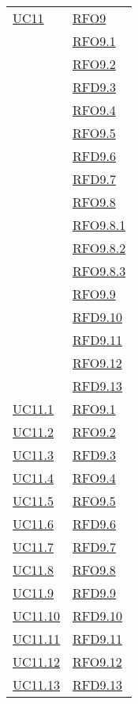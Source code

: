 \begin{longtable}{|>{\centering}m{5cm}|m{5cm}<{\centering}|}
\hyperlink{UC11}{UC11} 
& \hyperlink{RFO9}{RFO9}\\
& \hyperlink{RFO9.1}{RFO9.1}\\
& \hyperlink{RFO9.2}{RFO9.2}\\
& \hyperlink{RFD9.3}{RFD9.3}\\
& \hyperlink{RFO9.4}{RFO9.4}\\
& \hyperlink{RFO9.5}{RFO9.5}\\
& \hyperlink{RFD9.6}{RFD9.6}\\
& \hyperlink{RFD9.7}{RFD9.7}\\
& \hyperlink{RFO9.8}{RFO9.8}\\
& \hyperlink{RFO9.8.1}{RFO9.8.1}\\
& \hyperlink{RFO9.8.2}{RFO9.8.2}\\
& \hyperlink{RFO9.8.3}{RFO9.8.3}\\
& \hyperlink{RFO9.9}{RFO9.9}\\
& \hyperlink{RFD9.10}{RFD9.10}\\
& \hyperlink{RFD9.11}{RFD9.11}\\
& \hyperlink{RFO9.12}{RFO9.12}\\
& \hyperlink{RFD9.13}{RFD9.13}\\\hline

\hyperlink{UC11.1}{UC11.1} & \hyperlink{RFO9.1}{RFO9.1}\\\hline
\hyperlink{UC11.2}{UC11.2} & \hyperlink{RFO9.2}{RFO9.2}\\\hline
\hyperlink{UC11.3}{UC11.3} & \hyperlink{RFD9.3}{RFD9.3}\\\hline
\hyperlink{UC11.4}{UC11.4} & \hyperlink{RFO9.4}{RFO9.4}\\\hline
\hyperlink{UC11.5}{UC11.5} & \hyperlink{RFO9.5}{RFO9.5}\\\hline
\hyperlink{UC11.6}{UC11.6} & \hyperlink{RFD9.6}{RFD9.6}\\\hline
\hyperlink{UC11.7}{UC11.7} & \hyperlink{RFD9.7}{RFD9.7}\\\hline
\hyperlink{UC11.8}{UC11.8} & \hyperlink{RFO9.8}{RFO9.8}\\\hline
\hyperlink{UC11.9}{UC11.9} & \hyperlink{RFD9.9}{RFD9.9}\\\hline
\hyperlink{UC11.10}{UC11.10} & \hyperlink{RFD9.10}{RFD9.10}\\\hline
\hyperlink{UC11.11}{UC11.11} & \hyperlink{RFD9.11}{RFD9.11}\\\hline
\hyperlink{UC11.12}{UC11.12} & \hyperlink{RFO9.12}{RFO9.12}\\\hline
\hyperlink{UC11.13}{UC11.13} & \hyperlink{RFD9.13}{RFD9.13}\\\hline


\end{longtable}
